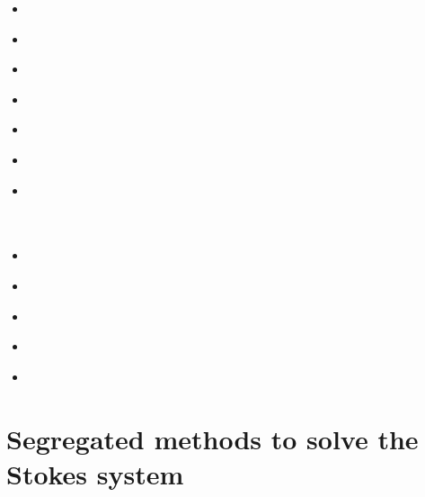 \begin{scriptsize}
\begin{itemize}
\item[\nineteenseventyeight] 
\textcite{pefc78} \\
\item[\twothousandseven] 
\textcite{zhpw03} \\
\item[\twothousandseven] 
\textcite{pazw05} \\
\item[\twothousandseven] 
\textcite{pazw07} \\
\item[\twothousandnine] 
\textcite{cohu09} \\
\item[\twothousandeleven] 
\textcite{spbk11} \\
\item[\twothousandthirteen] 
\textcite{conr13} \\
\textcite{ivjw13} \\
\textcite{awzh13} \\
\item[\twothousandfourteen] 
\textcite{larp14} \\
\item[\twothousandeighteen] 
\textcite{makv18} \\
\item[\twothousandnineteen] 
\textcite{halk19} \\
\item[\twothousandtwentyone]
\textcite{arpb21} \\
\item[\twothousandtwentytwo]
\textcite{kaza22} \\
\end{itemize}
\end{scriptsize}

\section{Segregated methods to solve the Stokes system}

